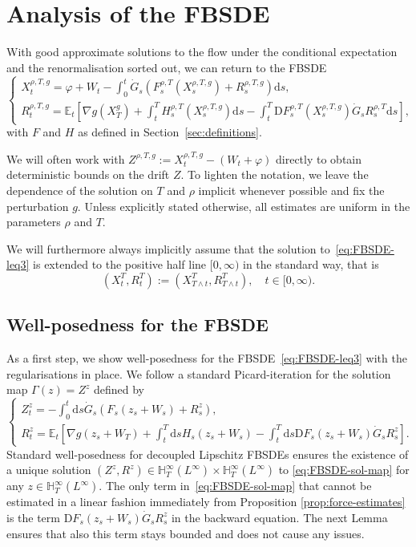 \documentclass[11pt, a4paper]{scrartcl}
\numberwithin{equation}{section}
\theoremstyle{plain}
\theoremstyle{remark}
\newcommand{\assign}{:=}
\newcommand{\mathD}{\mathrm{D}}
\newcommand{\mathd}{\mathrm{d}}
\begin{document}
\section{ Analysis of the FBSDE}\label{sec:FBSDE}

With good approximate solutions to the flow under the conditional expectation
and the renormalisation sorted out, we can return to the FBSDE
\begin{equation}
	\begin{cases}
		X_t^{\rho, T, g} = \varphi + W_t - \int_0^t \dot{G}_s (F^{\rho, T}_s
		(X_s^{\rho, T, g}) + R_s^{\rho, T, g}) \mathd s, \\
		R^{\rho, T, g}_t =\mathbb{E}_t \left[ \nabla g (X_T^g) + \int_t^T H^{\rho,
					T}_s (X_s^{\rho, T, g}) \mathd s - \int_t^T \mathD F^{\rho, T}_s
			(X_s^{\rho, T, g})  \dot{G}_s R_s^{\rho, T} \mathd s \right],
	\end{cases} \label{eq:FBSDE-leq3}
\end{equation}
with $F$ and $H$ as defined in Section~\ref{sec:definitions}.

We will often work with $Z^{\rho, T, g} \assign X_t^{\rho, T, g} - (W_t +
	\varphi)$ directly to obtain deterministic bounds on the drift $Z$. To lighten
the notation, we leave the dependence of the solution on $T$ and $\rho$
implicit whenever possible and fix the perturbation $g$. Unless
explicitly stated otherwise, all estimates are uniform in the parameters
$\rho$ and $T$.

We will furthermore always implicitly assume that the solution
to~\eqref{eq:FBSDE-leq3} is extended to the positive half line $[0, \infty)$
in the standard way, that is
\[ (X_t^T, R_t^T) \assign (X_{T \wedge t}^T, R_{T \wedge t}^T), \quad t \in
	[0, \infty) . \]
\subsection{Well-posedness for the FBSDE}

As a first step, we show well-posedness for the FBSDE~\eqref{eq:FBSDE-leq3}
with the regularisations in place. We follow a standard Picard-iteration for
the solution map $\Gamma (z) = Z^z$ defined by
\begin{equation}
	\begin{cases}
		Z^z_t = -\int_0^t \mathd s \dot{G}_s (F_s (z_s + W_s) + R^z_s), \\
		R^z_t =\mathbb{E}_t \left[ \nabla g (z_s + W_T) + \int_t^T \mathd s H_s
			(z_s + W_s) - \int_t^T \mathd s \mathD F_s (z_s + W_s)  \dot{G}_s R^z_s
			\right] .
	\end{cases} \label{eq:FBSDE-sol-map}
\end{equation}
Standard well-posedness for decoupled Lipschitz FBSDEs ensures the existence
of a unique solution $(Z^z, R^z) \in \mathbb{H}^{\infty}_T (L^{\infty}) \times
	\mathbb{H}^{\infty}_T (L^{\infty})$ to \eqref{eq:FBSDE-sol-map} for any $z \in
	\mathbb{H}^{\infty}_T (L^{\infty})$. The only term in~\eqref{eq:FBSDE-sol-map}
that cannot be estimated in a linear fashion immediately from Proposition
\ref{prop:force-estimates} is the term $\mathD F_s (z_s + W_s)  \dot{G}_s R^z_s$
in the backward equation. The next Lemma ensures that also this term stays
bounded and does not cause any issues.
\end{document}
